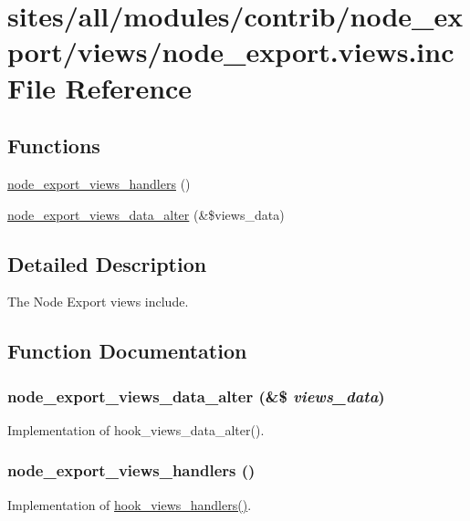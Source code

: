 \hypertarget{node__export_8views_8inc}{
\section{sites/all/modules/contrib/node\_\-export/views/node\_\-export.views.inc File Reference}
\label{node__export_8views_8inc}
}
\subsection*{Functions}
\begin{CompactItemize}
\item 
\hyperlink{node__export_8views_8inc_6d461472977c55f191db4a8afb03b9d5}{node\_\-export\_\-views\_\-handlers} ()
\item 
\hyperlink{node__export_8views_8inc_27f514d98c0cd06f172989bb077ba06f}{node\_\-export\_\-views\_\-data\_\-alter} (\&\$views\_\-data)
\end{CompactItemize}


\subsection{Detailed Description}
The Node Export views include. 

\subsection{Function Documentation}
\hypertarget{node__export_8views_8inc_27f514d98c0cd06f172989bb077ba06f}{
\subsubsection[{node\_\-export\_\-views\_\-data\_\-alter}]{\setlength{\rightskip}{0pt plus 5cm}node\_\-export\_\-views\_\-data\_\-alter (\&\$ {\em views\_\-data})}}
\label{node__export_8views_8inc_27f514d98c0cd06f172989bb077ba06f}


Implementation of hook\_\-views\_\-data\_\-alter(). \hypertarget{node__export_8views_8inc_6d461472977c55f191db4a8afb03b9d5}{
\subsubsection[{node\_\-export\_\-views\_\-handlers}]{\setlength{\rightskip}{0pt plus 5cm}node\_\-export\_\-views\_\-handlers ()}}
\label{node__export_8views_8inc_6d461472977c55f191db4a8afb03b9d5}


Implementation of \hyperlink{group__views__hooks_gbf506f44bd8d8a86876f27396f5341ed}{hook\_\-views\_\-handlers()}. 